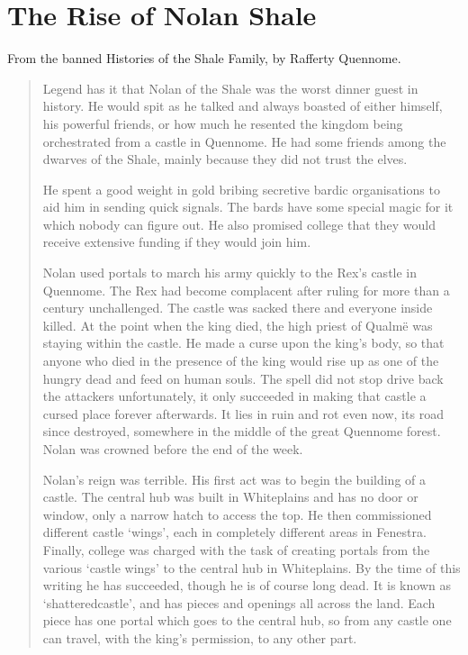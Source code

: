 \section{The Rise of Nolan Shale}
\label{nolan}

\begin{multicols}{2}

\noindent From the banned Histories of the Shale Family, by Rafferty Quennome.

\begin{quotation}

	Legend has it that Nolan of the Shale was the worst dinner guest in history.
	He would spit as he talked and always boasted of either himself, his powerful friends, or how much he resented the kingdom being orchestrated from a castle in Quennome.
	He had some friends among the dwarves of the Shale, mainly because they did not trust the elves.

	He spent a good weight in gold bribing secretive bardic organisations to aid him in sending quick signals.
	The bards have some special magic for it which nobody can figure out.
	He also promised \gls{college} that they would receive extensive funding if they would join him.

	Nolan used portals to march his army quickly to the Rex's castle in Quennome.
	The Rex had become complacent after ruling for more than a century unchallenged.
	The castle was sacked there and everyone inside killed.
	At the point when the king died, the high priest of Qualm\"{e} was staying within the castle.
	He made a curse upon the king's body, so that anyone who died in the presence of the king would rise up as one of the hungry dead and feed on human souls.
	The spell did not stop drive back the attackers unfortunately, it only succeeded in making that castle a cursed place forever afterwards.
	It lies in ruin and rot even now, its road since destroyed, somewhere in the middle of the great Quennome forest.
	Nolan was crowned before the end of the week.

	Nolan's reign was terrible.
	His first act was to begin the building of a castle.
	The central hub was built in Whiteplains and has no door or window, only a narrow hatch to access the top.
	He then commissioned different castle `wings', each in completely different areas in Fenestra.
	Finally, \gls{college} was charged with the task of creating portals from the various `castle wings' to the central hub in Whiteplains.
	By the time of this writing he has succeeded, though he is of course long dead.
	It is known as `\gls{shatteredcastle}', and has pieces and openings all across the land.
	Each piece has one portal which goes to the central hub, so from any castle one can travel, with the king's permission, to any other part.


\end{quotation}
\end{multicols}

